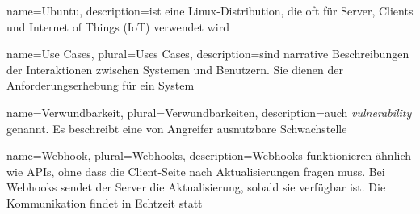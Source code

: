 
 {
    name={Ubuntu},
    description={ist eine Linux-Distribution, die oft für Server, Clients und Internet of Things (IoT) verwendet wird \citep{Ubuntu_ubuntu}}}

 {
    name={Use Cases},
    plural={Uses Cases},
    description={sind narrative Beschreibungen der Interaktionen zwischen Systemen und Benutzern. Sie dienen der Anforderungserhebung für ein System \citep{Savic_UseCase}}}


 {
    name={Verwundbarkeit},
    plural={Verwundbarkeiten},
    description={auch \textit{vulnerability} genannt. Es beschreibt eine von Angreifer ausnutzbare Schwachstelle \citep{Wendzel_IS}}}



 {
    name={Webhook},
    plural={Webhooks},
    description={Webhooks funktionieren ähnlich wie APIs, ohne dass die Client-Seite nach Aktualisierungen fragen muss. Bei Webhooks sendet der Server die Aktualisierung, sobald sie verfügbar ist. Die Kommunikation findet in Echtzeit statt \citep{Tas_webhook}}}





    